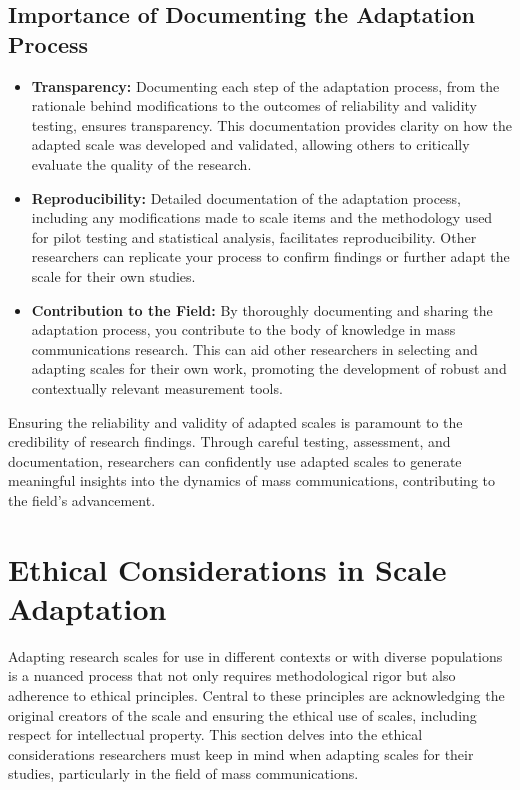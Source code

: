\documentclass[
]{book}
\begin{document}
\hypertarget{importance-of-documenting-the-adaptation-process}{%
\subsection{Importance of Documenting the Adaptation Process}\label{importance-of-documenting-the-adaptation-process}}

\begin{itemize}
\item
  \textbf{Transparency:} Documenting each step of the adaptation process, from the rationale behind modifications to the outcomes of reliability and validity testing, ensures transparency. This documentation provides clarity on how the adapted scale was developed and validated, allowing others to critically evaluate the quality of the research.
\item
  \textbf{Reproducibility:} Detailed documentation of the adaptation process, including any modifications made to scale items and the methodology used for pilot testing and statistical analysis, facilitates reproducibility. Other researchers can replicate your process to confirm findings or further adapt the scale for their own studies.
\item
  \textbf{Contribution to the Field:} By thoroughly documenting and sharing the adaptation process, you contribute to the body of knowledge in mass communications research. This can aid other researchers in selecting and adapting scales for their own work, promoting the development of robust and contextually relevant measurement tools.
\end{itemize}

Ensuring the reliability and validity of adapted scales is paramount to the credibility of research findings. Through careful testing, assessment, and documentation, researchers can confidently use adapted scales to generate meaningful insights into the dynamics of mass communications, contributing to the field's advancement.

\hypertarget{ethical-considerations-in-scale-adaptation}{%
\section{Ethical Considerations in Scale Adaptation}\label{ethical-considerations-in-scale-adaptation}}

Adapting research scales for use in different contexts or with diverse populations is a nuanced process that not only requires methodological rigor but also adherence to ethical principles. Central to these principles are acknowledging the original creators of the scale and ensuring the ethical use of scales, including respect for intellectual property. This section delves into the ethical considerations researchers must keep in mind when adapting scales for their studies, particularly in the field of mass communications.
\end{document}
